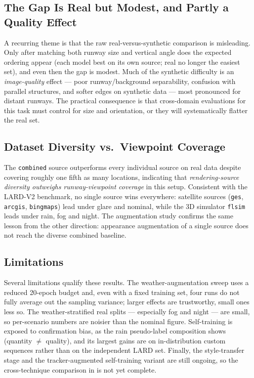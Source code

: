 \subsection{The Gap Is Real but Modest, and Partly a Quality Effect}
\label{subsec:disc-gap}
A recurring theme is that the raw real-versus-synthetic comparison is misleading. Only
after matching both runway size and vertical angle does the expected ordering appear
(each model best on its own source; real no longer the easiest set), and even then the
gap is modest. Much of the synthetic difficulty is an \emph{image-quality} effect ---
poor runway/background separability, confusion with parallel structures, and softer
edges on synthetic data --- most pronounced for distant runways. The practical
consequence is that cross-domain evaluations for this task must control for size and
orientation, or they will systematically flatter the real set.

\subsection{Dataset Diversity vs.\ Viewpoint Coverage}
\label{subsec:disc-diversity}
The \texttt{combined} source outperforms every individual source on real data despite
covering roughly one fifth as many locations, indicating that \emph{rendering-source
diversity outweighs runway-viewpoint coverage} in this setup. Consistent with the
LARD-V2 benchmark, no single source wins everywhere: satellite sources
(\texttt{ges}, \texttt{arcgis}, \texttt{bingmaps}) lead under glare and nominal, while
the 3D simulator \texttt{flsim} leads under rain, fog and night. The
augmentation study confirms the same lesson from the other direction: appearance
augmentation of a single source does not reach the diverse combined baseline.

\subsection{Limitations}
\label{subsec:disc-limitations}
Several limitations qualify these results. The weather-augmentation sweep uses a reduced
20-epoch budget and, even with a fixed training set, four runs do not fully average out
the sampling variance; larger effects are trustworthy, small ones less so. The
weather-stratified real splits --- especially fog and night --- are small, so
per-scenario numbers are noisier than the nominal figure. Self-training is exposed to
confirmation bias, as the rain pseudo-label composition shows (quantity $\neq$ quality),
and its largest gains are on in-distribution custom sequences rather than on the
independent LARD set. Finally, the style-transfer stage and the tracker-augmented
self-training variant are still ongoing, so the cross-technique comparison in
 is not yet complete.
